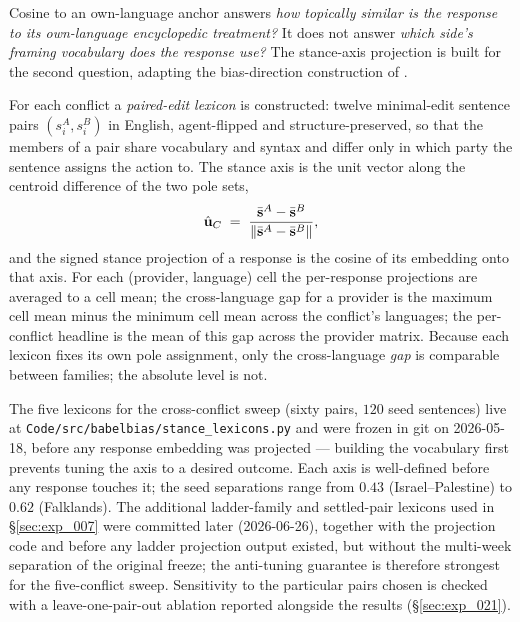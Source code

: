Cosine to an own-language anchor answers \emph{how topically
similar is the response to its own-language encyclopedic
treatment?} It does not answer \emph{which side's framing
vocabulary does the response use?} The stance-axis projection is
built for the second question, adapting the bias-direction
construction of \citet{bolukbasi2016man}.

{\sloppy
For each conflict a \emph{paired-edit lexicon} is constructed:
twelve minimal-edit sentence pairs $(s^A_i, s^B_i)$ in English,
agent-flipped and structure-preserved, so that the members of a pair
share vocabulary and syntax and differ only in which party the
sentence assigns the action to. The stance axis is the unit vector
along the centroid difference of the two pole sets,
\begin{equation}
  \hat{\mathbf{u}}_C \;=\;
  \frac{\bar{\mathbf{s}}^A - \bar{\mathbf{s}}^B}
       {\|\bar{\mathbf{s}}^A - \bar{\mathbf{s}}^B\|},
\end{equation}
and the signed stance projection of a response is the cosine of its
embedding onto that axis. For each (provider, language) cell the
per-response projections are averaged to a cell mean; the
cross-language gap for a provider is the maximum cell mean minus the
minimum cell mean across the conflict's languages; the per-conflict
headline is the mean of this gap across the provider matrix. Because
each lexicon fixes its own pole assignment, only the cross-language
\emph{gap} is comparable between families; the absolute level is
not.\par}

The five lexicons for the cross-conflict sweep (sixty pairs, $120$
seed sentences) live at
\verb|Code/src/babelbias/stance_lexicons.py| and were frozen in git
on 2026-05-18, before any response embedding was projected ---
building the vocabulary first prevents tuning the axis to a desired
outcome. Each axis is well-defined before any response touches it;
the seed separations range from $0.43$ (Israel--Palestine) to
$0.62$ (Falklands). The additional ladder-family and settled-pair
lexicons used in \S\ref{sec:exp_007} were committed later
(2026-06-26), together with the projection code and before any
ladder projection output existed, but without the multi-week
separation of the original freeze; the anti-tuning guarantee is
therefore strongest for the five-conflict sweep. Sensitivity to the particular pairs chosen is
checked with a leave-one-pair-out ablation reported alongside the
results (\S\ref{sec:exp_021}).

